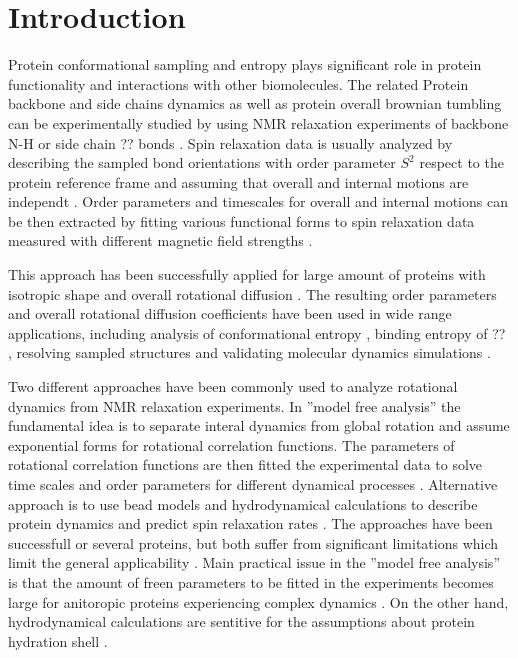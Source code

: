 \documentclass[pre,aps,floatfix,authordate1-4,twocolumn]{revtex4-1}
\begin{document}
\section{Introduction}
Protein conformational sampling and entropy
plays significant role in protein functionality
and interactions with other biomolecules.
The related Protein backbone and side chains dynamics 
as well as protein overall brownian tumbling
can be experimentally studied by using NMR relaxation experiments of backbone N-H
or side chain ?? bonds \cite{jarymowycz06,korzhnev01,bedem15}.
Spin relaxation data is usually analyzed by describing the sampled bond
orientations with order parameter $S^2$ respect to the protein reference frame
and assuming that overall and internal motions are independt \cite{??,korzhnev01}.
Order parameters and timescales for overall and internal motions can be then
extracted by fitting various functional forms to spin relaxation data
measured with different magnetic field strengths \cite{jarymowycz06,korzhnev01}.

This approach has been successfully applied for large amount of proteins
with isotropic shape and overall rotational diffusion \cite{jarymowycz06}.
The resulting order parameters and overall rotational diffusion coefficients
have been used in wide range applications, including analysis of conformational
entropy \cite{??}, binding entropy of ?? \cite{??}, resolving sampled structures \cite{??}
and validating molecular dynamics simulations \cite{??}.

Two different approaches have been commonly used to analyze
rotational dynamics from NMR relaxation experiments. In
''model free analysis'' the fundamental idea is to separate
interal dynamics from global rotation and assume exponential
forms for rotational correlation functions. The parameters of
rotational correlation functions are then fitted the experimental
data to solve time scales and order parameters for different dynamical
processes \cite{??}. Alternative approach is to use bead models and hydrodynamical
calculations to describe protein dynamics and predict spin relaxation rates \cite{??}.
The approaches have been successfull or several proteins, but both suffer
from significant limitations which limit the general applicability \cite{??}.
Main practical issue in the ''model free analysis'' is that the amount of
freen parameters to be fitted in the experiments becomes large for anitoropic
proteins experiencing complex dynamics \cite{??}. On the other hand,
hydrodynamical calculations are sentitive for the assumptions about
protein hydration shell \cite{??}.
 
\end{document}
